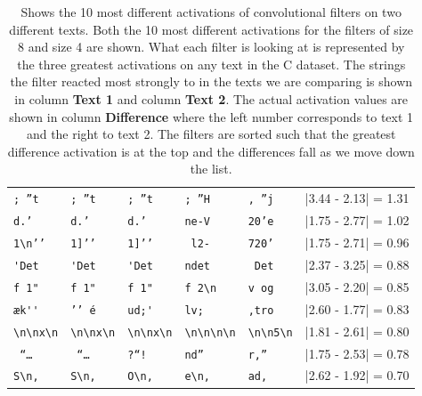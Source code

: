 \begin{table}
\begin{tabular}{lll|lll}
        \verb[; ”t[       & \verb[; ”t[       & \verb[; ”t[          &
        \verb'; ”H'       & \verb', ”j'       & |3.44 - 2.13| = 1.31 \\

        \verb[d.’ [       & \verb[d.’ [       & \verb[d.’ [          &
        \verb'ne-V'       & \verb'20’e'       & |1.75 - 2.77| = 1.02 \\

        \verb[1\n’’[      & \verb[1]’’[       & \verb[1]’’[          &
        \verb' l2-'       & \verb'720’'       & |1.75 - 2.71| = 0.96 \\

        \verb['Det[       & \verb['Det[       & \verb['Det[          &
        \verb'ndet'       & \verb' Det'       & |2.37 - 3.25| = 0.88 \\

        \verb[f 1"[       & \verb[f 1"[       & \verb[f 1"[          &
        \verb'f 2\n'      & \verb'v og'       & |3.05 - 2.20| = 0.85 \\

        \verb[æk''[       & \verb[’’ é[       & \verb[ud;'[          &
        \verb'lv; '       & \verb',tro'       & |2.60 - 1.77| = 0.83 \\

        \verb[\n\nx\n[    & \verb[\n\nx\n[    & \verb[\n\nx\n[       &
        \verb'\n\n\n\n'   & \verb'\n\n5\n'    & |1.81 - 2.61| = 0.80 \\
        \verb[ “… [       & \verb[ “… [       & \verb[?“! [          &
        \verb'nd” '       & \verb'r,” '       & |1.75 - 2.53| = 0.78 \\

        \verb[S\n, [      & \verb[S\n, [      & \verb[O\n, [         &
        \verb'e\n, '      & \verb'ad, '       & |2.62 - 1.92| = 0.70 \\
    \end{tabular}
    \caption{Shows the 10 most different activations of convolutional filters on
        two different texts. Both the 10 most different activations for the
        filters of size 8 and size 4 are shown. What each filter is looking at is
        represented by the three greatest activations on any text in the \gls{C}
        dataset. The strings the filter reacted most strongly to in the texts we
        are comparing is shown in column \textbf{Text 1} and column \textbf{Text
        2}. The actual activation values are shown in column \textbf{Difference}
        where the left number corresponds to text 1 and the right to text 2. The
        filters are sorted such that the greatest difference activation is at
        the top and the differences fall as we move down the list.}
    \label{tab:teacher_feedback_output}
\end{table}

